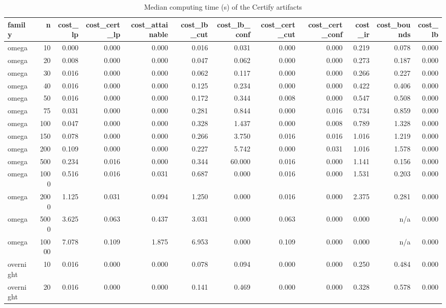 \begin{table}[htbp]
\centering
\small
\caption{Median computing time (s) of the Certify artifacts}
\label{tab:certify_costs}
\begin{tabular}{lrrrrrrrrrrr}
\toprule
family & n & cost\_lp & cost\_cert\_lp & cost\_attainable & cost\_lb\_cut & cost\_lb\_conf & cost\_cert\_cut & cost\_cert\_conf & cost\_ir & cost\_bounds & cost\_lb \\
\midrule
omega & 10 & 0.000 & 0.000 & 0.000 & 0.016 & 0.031 & 0.000 & 0.000 & 0.219 & 0.078 & 0.000 \\
omega & 20 & 0.008 & 0.000 & 0.000 & 0.047 & 0.062 & 0.000 & 0.000 & 0.273 & 0.187 & 0.000 \\
omega & 30 & 0.016 & 0.000 & 0.000 & 0.062 & 0.117 & 0.000 & 0.000 & 0.266 & 0.227 & 0.000 \\
omega & 40 & 0.016 & 0.000 & 0.000 & 0.125 & 0.234 & 0.000 & 0.000 & 0.422 & 0.406 & 0.000 \\
omega & 50 & 0.016 & 0.000 & 0.000 & 0.172 & 0.344 & 0.008 & 0.000 & 0.547 & 0.508 & 0.000 \\
omega & 75 & 0.031 & 0.000 & 0.000 & 0.281 & 0.844 & 0.000 & 0.016 & 0.734 & 0.859 & 0.000 \\
omega & 100 & 0.047 & 0.000 & 0.000 & 0.328 & 1.437 & 0.000 & 0.008 & 0.789 & 1.328 & 0.000 \\
omega & 150 & 0.078 & 0.000 & 0.000 & 0.266 & 3.750 & 0.016 & 0.016 & 1.016 & 1.219 & 0.000 \\
omega & 200 & 0.109 & 0.000 & 0.000 & 0.227 & 5.742 & 0.000 & 0.031 & 1.016 & 1.578 & 0.000 \\
omega & 500 & 0.234 & 0.016 & 0.000 & 0.344 & 60.000 & 0.016 & 0.000 & 1.141 & 0.156 & 0.000 \\
omega & 1000 & 0.516 & 0.016 & 0.031 & 0.687 & 0.000 & 0.016 & 0.000 & 1.531 & 0.203 & 0.000 \\
omega & 2000 & 1.125 & 0.031 & 0.094 & 1.250 & 0.000 & 0.016 & 0.000 & 2.375 & 0.281 & 0.000 \\
omega & 5000 & 3.625 & 0.063 & 0.437 & 3.031 & 0.000 & 0.063 & 0.000 & 0.000 & n/a & 0.000 \\
omega & 10000 & 7.078 & 0.109 & 1.875 & 6.953 & 0.000 & 0.109 & 0.000 & 0.000 & n/a & 0.000 \\
overnight & 10 & 0.016 & 0.000 & 0.000 & 0.078 & 0.094 & 0.000 & 0.000 & 0.250 & 0.484 & 0.000 \\
overnight & 20 & 0.016 & 0.000 & 0.000 & 0.141 & 0.469 & 0.000 & 0.000 & 0.328 & 0.578 & 0.000 \\

\end{tabular}
\end{table}
